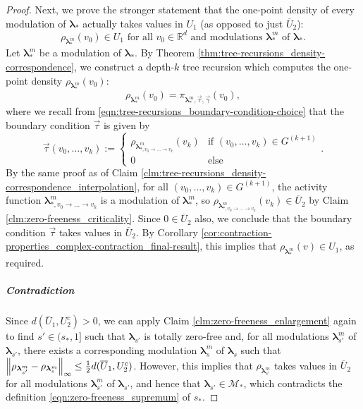 \documentclass[11pt]{article}
\newcommand{\R}{\mathbb R}
\newcommand{\bl}{\bm{\lambda}}
\numberwithin{equation}{section}
\theoremstyle{plain}
\theoremstyle{definition}
\theoremstyle{remark}
\begin{document}
\begin{proof}
Next, we prove the stronger statement that the one-point density of every modulation of $\bl_{\ast}$ actually takes values in $U_{1}$ (as opposed to just $\overline{U}_{2}$):
\begin{equation}
\rho_{\bl^{m}_{\ast}}(v_{0})\in U_{1}\text{ for all }v_{0}\in\R^{d}\text{ and modulations }\bl^{m}_{\ast}\text{ of }\bl_{\ast}.
\end{equation}
Let $\bl^{m}_{\ast}$ be a modulation of $\bl_{\ast}$.
By Theorem \ref{thm:tree-recursions_density-correspondence}, we construct a depth-$k$ tree recursion which computes the one-point density $\rho_{\bl^{m}_{\ast}}(v_{0})$:
\begin{equation}
\rho_{\bl^{m}_{\ast}}(v_{0})=\pi_{\bl^{m}_{\ast},\vec{\tau},\vec{\gamma}}(v_{0}),
\end{equation}
where we recall from \eqref{eqn:tree-recursions_boundary-condition-choice} that the boundary condition $\vec{\tau}$ is given by 
\begin{equation}
\vec{\tau}(v_{0},\dots,v_{k}):=
\begin{cases}
\rho_{\bl^{m}_{\ast,v_{0}\rightarrow\dots\rightarrow v_{k}}}(v_{k}) & \text{if } (v_{0},\dots,v_{k})\in G^{(k+1)} \\
0 & \text{else}
\end{cases}.
\end{equation}
By the same proof as of Claim \ref{clm:tree-recursions_density-correspondence_interpolation}, for all $(v_{0},\dots,v_{k})\in G^{(k+1)}$, the activity function $\bl^{m}_{\ast,v_{0}\rightarrow\dots\rightarrow v_{k}}$ is a modulation of $\bl^{m}_{\ast}$, so $\rho_{\bl^{m}_{\ast,v_{0}\rightarrow\dots\rightarrow v_{k}}}(v_{k})\in\overline{U}_{2}$ by Claim \ref{clm:zero-freeness_criticality}.
Since $0\in\overline{U}_{2}$ also, we conclude that the boundary condition $\vec{\tau}$ takes values in $\overline{U}_{2}$.
By Corollary \ref{cor:contraction-properties_complex-contraction_final-result}, this implies that $\rho_{\bl_{\ast}^{m}}(v)\in U_{1}$, as required.

\subparagraph{Contradiction}

Since $d(\overline{U}_{1},U_{2}^{c})>0$, we can apply Claim \ref{clm:zero-freeness_enlargement} again to find $s'\in(s_{\ast},1]$ such that $\bl_{s'}$ is totally zero-free and, for all modulations $\bl_{s'}^{m}$ of $\bl_{s'}$, there exists a corresponding modulation $\bl_{s}^{m}$ of $\bl_{s}$ such that $\norm{\rho_{\bl_{s'}^{m}}-\rho_{\bl_{s}^{m}}}_{\infty}\le\frac{1}{2}d(\overline{U}_{1},U_{2}^{c})$.
However, this implies that $\rho_{\bl_{s'}^{m}}$ takes values in $\overline{U}_{2}$ for all modulations $\bl_{s'}^{m}$ of $\bl_{s'}$, and hence that $\bl_{s'}\in\mathcal{M}_{\ast}$, which contradicts the definition \eqref{eqn:zero-freeness_supremum} of $s_{\ast}$.
\end{proof}
\end{document}
